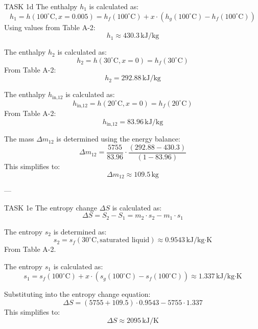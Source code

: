 TASK 1d  
The enthalpy \( h_1 \) is calculated as:  
\[
h_1 = h(100^\circ\text{C}, x = 0.005) = h_f(100^\circ\text{C}) + x \cdot \left(h_g(100^\circ\text{C}) - h_f(100^\circ\text{C})\right)
\]  
Using values from Table A-2:  
\[
h_1 \approx 430.3 \, \text{kJ/kg}
\]  

The enthalpy \( h_2 \) is calculated as:  
\[
h_2 = h(30^\circ\text{C}, x = 0) = h_f(30^\circ\text{C})
\]  
From Table A-2:  
\[
h_2 = 292.88 \, \text{kJ/kg}
\]  

The enthalpy \( h_{\text{in,12}} \) is calculated as:  
\[
h_{\text{in,12}} = h(20^\circ\text{C}, x = 0) = h_f(20^\circ\text{C})
\]  
From Table A-2:  
\[
h_{\text{in,12}} = 83.96 \, \text{kJ/kg}
\]  

The mass \( \Delta m_{12} \) is determined using the energy balance:  
\[
\Delta m_{12} = \frac{5755}{83.96} \cdot \frac{(292.88 - 430.3)}{(1 - 83.96)}
\]  
This simplifies to:  
\[
\Delta m_{12} \approx 109.5 \, \text{kg}
\]  

---

TASK 1e  
The entropy change \( \Delta S \) is calculated as:  
\[
\Delta S = S_2 - S_1 = m_2 \cdot s_2 - m_1 \cdot s_1
\]  

The entropy \( s_2 \) is determined as:  
\[
s_2 = s_f(30^\circ\text{C}, \text{saturated liquid}) \approx 0.9543 \, \text{kJ/kg·K}
\]  
From Table A-2.  

The entropy \( s_1 \) is calculated as:  
\[
s_1 = s_f(100^\circ\text{C}) + x \cdot \left(s_g(100^\circ\text{C}) - s_f(100^\circ\text{C})\right) \approx 1.337 \, \text{kJ/kg·K}
\]  

Substituting into the entropy change equation:  
\[
\Delta S = (5755 + 109.5) \cdot 0.9543 - 5755 \cdot 1.337
\]  
This simplifies to:  
\[
\Delta S \approx 2095 \, \text{kJ/K}
\]
